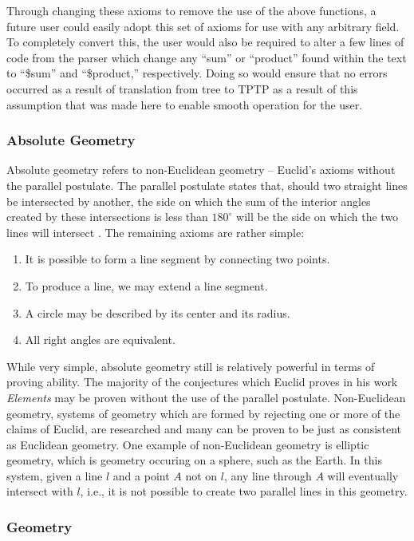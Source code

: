 Through changing these axioms to remove the use of the above functions, a future user could easily adopt this set of axioms for use with any arbitrary field. To completely convert this, the user would also be required to alter a few lines of code from the parser which change any ``sum'' or ``product'' found within the text to ``\$sum'' and ``\$product,'' respectively. Doing so would ensure that no errors occurred as a result of translation from tree to TPTP as a result of this assumption that was made here to enable smooth operation for the user.

\subsubsection{Absolute Geometry}

Absolute geometry refers to non-Euclidean geometry -- Euclid's axioms without the parallel postulate. The parallel postulate states that, should two straight lines be intersected by another, the side on which the sum of the interior angles created by these intersections is less than $180^{\circ}$ will be the side on which the two lines will intersect \cite{absolute}. The remaining axioms are rather simple:
\begin{enumerate}
	\item It is possible to form a line segment by connecting two points.
	\item To produce a line, we may extend a line segment.
	\item A circle may be described by its center and its radius.
	\item All right angles are equivalent.
\end{enumerate}

While very simple, absolute geometry still is relatively powerful in terms of proving ability. The majority of the conjectures which Euclid proves in his work \textit{Elements} may be proven without the use of the parallel postulate. Non-Euclidean geometry, systems of geometry which are formed by rejecting one or more of the claims of Euclid, are researched and many can be proven to be just as consistent as Euclidean geometry. One example of non-Euclidean geometry is elliptic geometry, which is geometry occuring on a sphere, such as the Earth. In this system, given a line $l$ and a point $A$ not on $l$, any line through $A$ will eventually intersect with $l$, i.e., it is not possible to create two parallel lines in this geometry.

\subsubsection{Geometry}

